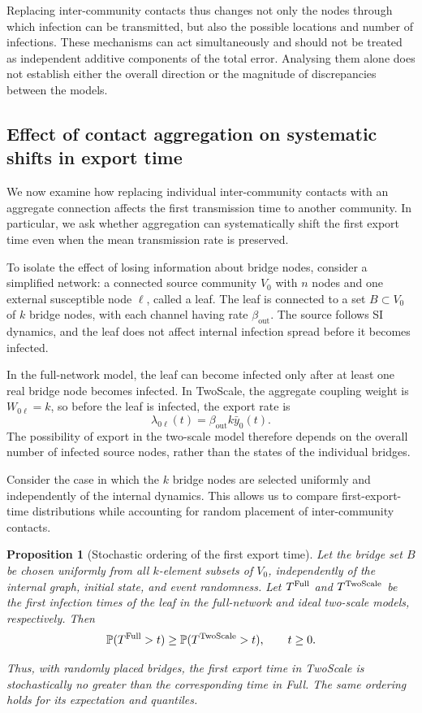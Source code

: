 \documentclass{ieeeaccess}
\newtheorem{proposition}{Proposition}
\newcommand{\ibar}{\bar{y}}
\newcommand{\Full}{\textup{Full}}
\newcommand{\TS}{\textup{TwoScale}}
\begin{document}
Replacing inter-community contacts thus changes not only the nodes through which infection can be transmitted, but also the possible locations and number of infections. These mechanisms can act simultaneously and should not be treated as independent additive components of the total error. Analysing them alone does not establish either the overall direction or the magnitude of discrepancies between the models.

\subsection{Effect of contact aggregation on systematic shifts in export time}
\label{sec:single_export}

We now examine how replacing individual inter-community contacts with an aggregate connection affects the first transmission time to another community. In particular, we ask whether aggregation can systematically shift the first export time even when the mean transmission rate is preserved.

To isolate the effect of losing information about bridge nodes, consider a simplified network: a connected source community $V_0$ with $n$ nodes and one external susceptible node $\ell$, called a leaf. The leaf is connected to a set $B\subset V_0$ of $k$ bridge nodes, with each channel having rate $\beta_{\mathrm{out}}$. The source follows SI dynamics, and the leaf does not affect internal infection spread before it becomes infected.

In the full-network model, the leaf can become infected only after at least one real bridge node becomes infected. In \TS{}, the aggregate coupling weight is $W_{0\ell}=k$, so before the leaf is infected, the export rate is
\[
\lambda_{0\ell}(t)
=
\beta_{\mathrm{out}}k\ibar_0(t).
\]
The possibility of export in the two-scale model therefore depends on the overall number of infected source nodes, rather than the states of the individual bridges.

Consider the case in which the $k$ bridge nodes are selected uniformly and independently of the internal dynamics. This allows us to compare first-export-time distributions while accounting for random placement of inter-community contacts.

\begin{proposition}[Stochastic ordering of the first export time]
\label{prop:ordering}
Let the bridge set $B$ be chosen uniformly from all $k$-element subsets of $V_0$, independently of the internal graph, initial state, and event randomness. Let $T^{\Full}$ and $T^{\TS}$ be the first infection times of the leaf in the full-network and ideal two-scale models, respectively. Then
\[
\mathbb{P}(T^{\Full}>t)
\geq
\mathbb{P}(T^{\TS}>t),
\qquad t\geq 0.
\]

Thus, with randomly placed bridges, the first export time in \TS{} is stochastically no greater than the corresponding time in \Full{}. The same ordering holds for its expectation and quantiles.
\end{proposition}
\end{document}
